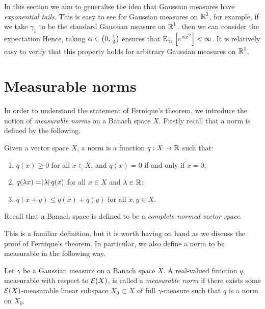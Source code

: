 \documentclass[../main.tex]{subfiles}
\begin{document}
In this section we aim to generalise the idea that Gaussian measures have \emph{exponential tails}. This is easy to see for Gaussian measures on $\operatorname{\mathbb{R}}^1$, for example, if we take $\gamma_1$ to be the standard Gaussian measure on $\operatorname{\mathbb{R}}^1$, then we can consider the expectation  Hence, taking $\alpha\in\intoo{0,\frac12}$ ensures that $\Ex_{\gamma_1}\sbr{e^{\alpha x^2}}<\infty$. It is relatively easy to verify that this property holds for arbitrary Gaussian measures on $\operatorname{\mathbb{R}}^1$.

\section{Measurable norms}

In order to understand the statement of Fernique's theorem, we introduce the notion of \emph{measurable norms} on a Banach space $X$. Firstly recall that a norm is defined by the following.
\begin{definition}
\label{def:norm}
Given a vector space $X$, a norm is a function $q:X\to\operatorname{\mathbb{R}}$ such that:
\begin{enumerate}
    \item $q(x)\geq 0$ for all $x\in X$, and $q(x) = 0$ if and only if $x = 0$;
    \item $q(\lambda x) = \abs{\lambda}q(x)$ for all $x\in X$ and $\lambda\in\operatorname{\mathbb{R}}$;
    \item $q(x+y)\leq q(x)+q(y)$ for all $x,y\in X$.
\end{enumerate}
\end{definition}
\begin{remark}
Recall that a Banach space is defined to be a \emph{complete normed vector space}.
\end{remark}

This is a familiar definition, but it is worth having on hand as we discuss the proof of Fernique's theorem. In particular, we also define a norm to be measurable in the following way.
\begin{definition}
\label{def:meas_norm}
Let $\gamma$ be a Gaussian measure on a Banach space $X$. A real-valued function $q$, measurable with respect to $\mathcal{E}(X)$, is called a \emph{measurable norm} if there exists some $\mathcal{E}(X)$-measurable linear subspace $X_0\subset X$ of full $\gamma$-measure such that $q$ is a norm on $X_0$.
\end{definition}
\end{document}
